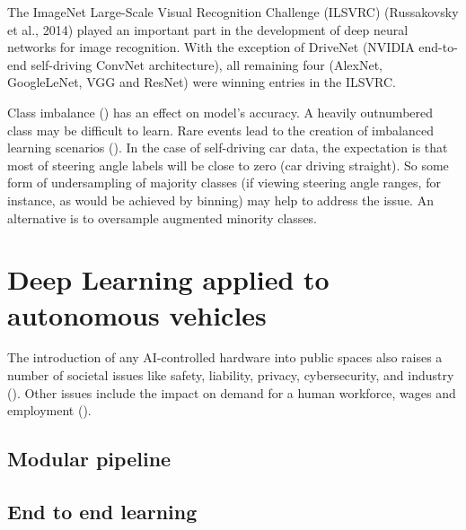 The  ImageNet Large-Scale Visual Recognition Challenge (ILSVRC) (Russakovsky et al., 2014) played an important part in the development of deep neural networks for image recognition. With the exception of DriveNet (NVIDIA end-to-end self-driving ConvNet architecture), all remaining four (AlexNet, GoogleLeNet, VGG and ResNet) were winning entries in the ILSVRC.  




Class imbalance (\cite{batista2004study}) has an effect on model's accuracy. A heavily outnumbered class may be difficult to learn. Rare events lead to the creation of imbalanced learning scenarios (\cite{krawczyk2016learning}). In the case of self-driving car data, the expectation is that most of steering angle labels will be close to zero (car driving straight). So some form of undersampling of majority classes (if viewing steering angle ranges, for instance, as would be achieved by binning) may help to address the issue. An alternative is to oversample augmented 
minority classes.


\section{Deep Learning applied to autonomous vehicles}


The introduction of any AI-controlled hardware into public spaces also raises a number of societal issues like safety, liability, privacy, cybersecurity, and industry (\cite{Taeihagh_2018}).
Other issues include the impact on demand for a human workforce, wages and employment (\cite{acemoglu2018artificial}).
\subsection{Modular pipeline}

\subsection{End to end learning}

